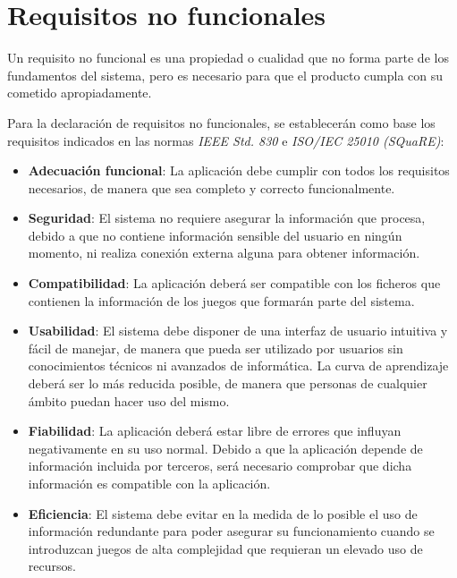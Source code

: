 \section{Requisitos no funcionales}
Un requisito no funcional es una propiedad o cualidad que no forma parte de los 
fundamentos del sistema, pero es necesario para que el producto cumpla con su
cometido apropiadamente. \medskip

Para la declaración de requisitos no funcionales, se establecerán como base los 
requisitos indicados en las normas \textit{IEEE Std. 830} e \textit{ISO/IEC 25010 (SQuaRE)}:

\begin{itemize}
    
    \item \textbf{Adecuación funcional}: La aplicación debe cumplir con todos los requisitos necesarios, 
    de manera que sea completo y correcto funcionalmente.

    \item \textbf{Seguridad}: El sistema no requiere asegurar la información que procesa, debido a que 
    no contiene información sensible del usuario en ningún momento, ni realiza conexión externa alguna 
    para obtener información.
    
    \item \textbf{Compatibilidad}: La aplicación deberá ser compatible con los ficheros que contienen
    la información de los juegos que formarán parte del sistema.
    
    \item \textbf{Usabilidad}: El sistema debe disponer de una interfaz de usuario intuitiva y fácil de 
    manejar, de manera que pueda ser utilizado por usuarios sin conocimientos técnicos ni avanzados de 
    informática. La curva de aprendizaje deberá ser lo más reducida posible, de manera que personas de 
    cualquier ámbito puedan hacer uso del mismo.

    \item \textbf{Fiabilidad}: La aplicación deberá estar libre de errores que influyan negativamente 
    en su uso normal. Debido a que la aplicación depende de información incluida por terceros, será 
    necesario comprobar que dicha información es compatible con la aplicación.
    
    \item \textbf{Eficiencia}: El sistema debe evitar en la medida de lo posible el uso de información 
    redundante para poder asegurar su funcionamiento cuando se introduzcan juegos de alta complejidad 
    que requieran un elevado uso de recursos.


\end{itemize}
